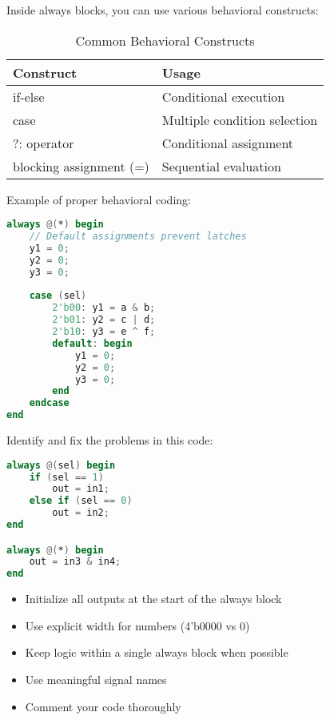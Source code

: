\documentclass[12pt]{betterjournal}
\begin{document}
Inside always blocks, you can use various behavioral constructs:

\begin{table}[H]
    \centering
    \begin{tabular}{|l|l|}
    \hline
    \textbf{Construct} & \textbf{Usage} \\
    \hline
    if-else & Conditional execution \\
    case & Multiple condition selection \\
    ?: operator & Conditional assignment \\
    blocking assignment (=) & Sequential evaluation \\
    \hline
    \end{tabular}
    \caption{Common Behavioral Constructs}
    \label{tab:constructs}
\end{table}

Example of proper behavioral coding:
\begin{lstlisting}[language=verilog]
always @(*) begin
    // Default assignments prevent latches
    y1 = 0;
    y2 = 0;
    y3 = 0;
    
    case (sel)
        2'b00: y1 = a & b;
        2'b01: y2 = c | d;
        2'b10: y3 = e ^ f;
        default: begin
            y1 = 0;
            y2 = 0;
            y3 = 0;
        end
    endcase
end
\end{lstlisting}

\begin{question}
Identify and fix the problems in this code:
\begin{lstlisting}[language=verilog]
always @(sel) begin
    if (sel == 1)
        out = in1;
    else if (sel == 0)
        out = in2;
end

always @(*) begin
    out = in3 & in4;
end
\end{lstlisting}
\end{question}

\begin{extra}[frametitle={Design Guidelines}]
\begin{itemize}
    \item Initialize all outputs at the start of the always block
    \item Use explicit width for numbers (4'b0000 vs 0)
    \item Keep logic within a single always block when possible
    \item Use meaningful signal names
    \item Comment your code thoroughly
\end{itemize}
\end{extra}
\end{document}
